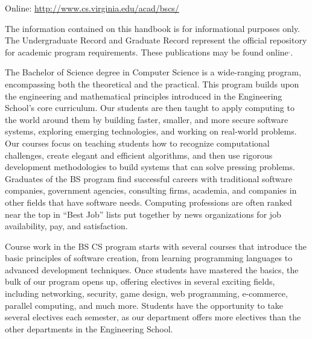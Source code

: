 \noindent Online: \url{http://www.cs.virginia.edu/acad/bscs/}


The information contained on this handbook is for informational
purposes only. The Undergraduate Record and Graduate Record represent
the official repository for academic program requirements. These
publications may be found online$^,$.




The Bachelor of Science degree in Computer Science is a wide-ranging
program, encompassing both the theoretical and the practical.  This
program builds upon the engineering and mathematical principles
introduced in the Engineering School's core curriculum.  Our students
are then taught to apply computing to the world around them by building
faster, smaller, and more secure software systems, exploring emerging
technologies, and working on real-world problems.  Our courses focus
on teaching students how to recognize computational challenges, create
elegant and efficient algorithms, and then use rigorous development
methodologies to build systems that can solve pressing
problems. Graduates of the BS program find successful careers with
traditional software companies, government agencies, consulting firms,
academia, and companies in other fields that have software needs.
Computing professions are often ranked near the top in ``Best Job''
lists put together by news organizations for job availability, pay,
and satisfaction.

Course work in the BS CS program starts with several courses that
introduce the basic principles of software creation, from learning
programming languages to advanced development techniques.  Once
students have mastered the basics, the bulk of our program opens up,
offering electives in several exciting fields, including networking,
security, game design, web programming, e-commerce, parallel
computing, and much more.  Students have the opportunity to take
several electives each semester, as our department offers more
electives than the other departments in the Engineering School. 



